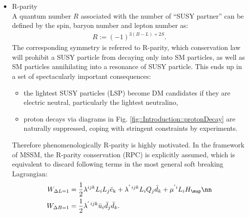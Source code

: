 \begin{itemize}
\item R-parity  \\
A quantum number $R$ associated with the number of ``SUSY partner'' can be defined by the spin, baryon number and lepton number as:
\begin{align}
R := (-1)^{3(B-L)+2S}.
\end{align}
The corresponding symmetry is referred to R-parity, which conservation law will prohibit a SUSY particle from decaying only into SM particles, as well as SM particles annihilating into a resonance of SUSY particle. 
This ends up in a set of spectacularly important consequences: 
\begin{itemize}
\item the lightest SUSY particles (LSP) become DM candidates if they are electric neutral, particularly the lightest neutralino,
\item proton decays via diagrams in Fig. \ref{fig::Introduction::protonDecay} are naturally suppressed, coping with stringent constraints by experiments.
\end{itemize}
Therefore phenomenologically R-parity is highly motivated.
In the framework of MSSM, the R-parity conservation (RPC) is explicitly assumed, which is equivalent to discard following terms in the most general soft breaking Lagrangian:
\begin{align}
W_{\Delta L=1} & = \frac{1}{2} \lambda^{ijk} L_i L_j \bar{e}_\mathrm{k} + \lambda^{'\, ijk} L_i Q_j \bar{d}_k + \mu^{'i} L_i H_\mup \nn \\
W_{\Delta B=1} & = \frac{1}{2} \lambda^{'\, ijk} \bar{u}_i  \bar{d}_j  \bar{d}_k.
\label{eq::RPVterms}
\end{align}


\end{itemize}

